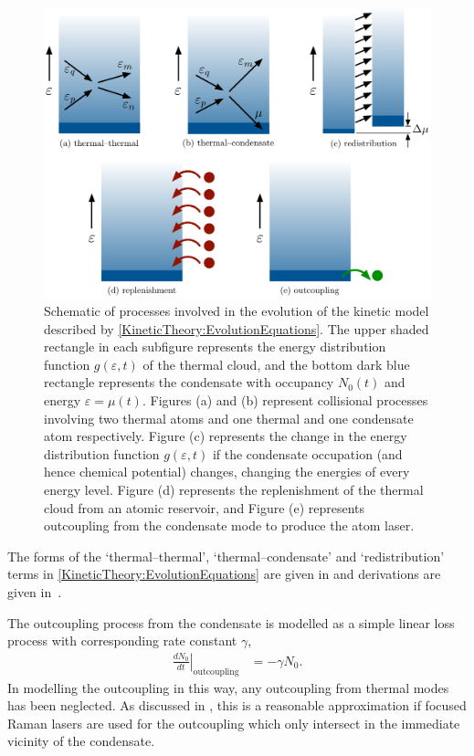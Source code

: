 \begin{figure}
    \centering
    \includegraphics[width=14cm]{ProcessDiagrams}
    \caption{Schematic of processes involved in the evolution of the kinetic model described by \eqref{KineticTheory:EvolutionEquations}.  The upper shaded rectangle in each subfigure represents the energy distribution function $g(\varepsilon, t)$ of the thermal cloud, and the bottom dark blue rectangle represents the condensate with occupancy $N_0(t)$ and energy $\varepsilon = \mu(t)$. Figures (a) and (b) represent collisional processes involving two thermal atoms and one thermal and one condensate atom respectively. Figure (c) represents the change in the energy distribution function $g(\varepsilon, t)$ if the condensate occupation (and hence chemical potential) changes, changing the energies of every energy level. Figure (d) represents the replenishment of the thermal cloud from an atomic reservoir, and Figure (e) represents outcoupling from the condensate mode to produce the atom laser.}
    \label{KineticTheory:ProcessDiagrams}
\end{figure}

The forms of the `thermal--thermal', `thermal--condensate' and `redistribution' terms in \eqref{KineticTheory:EvolutionEquations} are given in  and derivations are given in~\citep{Bijlsma:2000}.

The outcoupling process from the condensate is modelled as a simple linear loss process with corresponding rate constant $\gamma$,
\begin{align}
    \left.\frac{d N_0}{d t}\right|_\text{outcoupling} &= - \gamma N_0.
    \label{KineticTheory:OutcouplingProcess}
\end{align}
In modelling the outcoupling in this way, any outcoupling from thermal modes has been neglected. As discussed in , this is a reasonable approximation if focused Raman lasers are used for the outcoupling which only intersect in the immediate vicinity of the condensate. 

